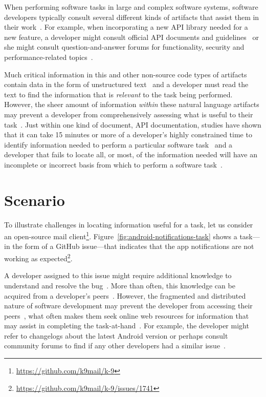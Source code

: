 

When performing software tasks in large and complex software systems, software developers typically consult several different kinds of artifacts that assist them in their work~\cite{Starke2009, Meyer2017}. For example, 
when incorporating a new API library needed for a new feature, a developer might consult official API documents and guidelines~\cite{robillard2011field, umarji2008archetypal} or she might consult question-and-answer forums for functionality, security and performance-related topics~\cite{parnin2012, silva2019}.



Much critical information in this and other non-source code types of artifacts 
contain data in the form of unstructured text~\cite{Bavota2016} and 
a developer must read the text to find the information that is \textit{relevant} to the task being performed.
However, the sheer amount of information \textit{within} these natural language artifacts may prevent a developer from comprehensively assessing what is useful to their task~\cite{Murphy2005}. Just within one kind of document, API
documentation, studies have shown that it can take 15 minutes or more
of a developer's highly constrained time to identify 
information needed to perform a particular software task~\cite{endrikat2014, Meyer2017}
and a developer that fails to locate all, or most, of the information needed
 will have an incomplete or incorrect basis from which to perform a software task~\cite{Murphy2005}.





\section{Scenario}
\label{cp1:example}




To illustrate challenges in locating information useful for a task, let us consider an open-source mail client\footnote{\url{https://github.com/k9mail/k-9}}.
Figure~\ref{fig:android-notifications-task} shows a task---in the form of a GitHub issue---that indicates that the app notifications 
are not working as expected\footnote{\url{https://github.com/k9mail/k-9/issues/1741}}. 


A developer assigned to this issue might require additional knowledge to understand and resolve the bug~\cite{ko2007, Li2013, sillito2006}. 
More than often, this knowledge can be acquired from a developer's peers~\cite{singer2011}. 
However, the fragmented and distributed nature of software development  
may prevent the developer from accessing their peers~\cite{ko2007},
what often makes  them seek online web resources for information 
that may assist in completing the task-at-hand~\cite{Xia2017, rao2020}.
For example, the developer might refer to changelogs 
about the latest Android version or perhaps
consult community forums to find if any other developers had a similar issue~\cite{parnin2012}. 


